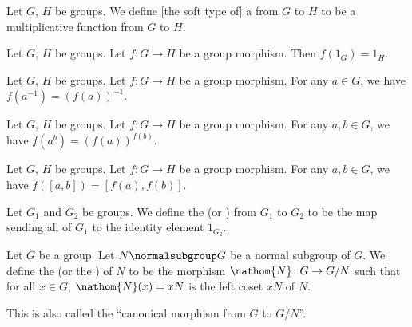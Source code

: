 \begin{definition}
Let $G$, $H$ be groups.
We define [the soft type of] a  from $G$ to $H$
to be a multiplicative function from $G$ to $H$.
\end{definition}

\begin{theorem}
Let $G$, $H$ be groups.
Let $f\colon G\to H$ be a group morphism.
Then $f(1_{G})=1_{H}$.
\end{theorem}

\begin{theorem}
Let $G$, $H$ be groups.
Let $f\colon G\to H$ be a group morphism.
For any $a\in G$, we have $f(a^{-1})=(f(a))^{-1}$.
\end{theorem}

\begin{theorem}
Let $G$, $H$ be groups.
Let $f\colon G\to H$ be a group morphism.
For any $a,b\in G$, we have $f(a^{b})=(f(a))^{f(b)}$.
\end{theorem}

\begin{theorem}
Let $G$, $H$ be groups.
Let $f\colon G\to H$ be a group morphism.
For any $a,b\in G$, we have $f([a,b])=[f(a),f(b)]$.
\end{theorem}

\begin{definition}
Let $G_{1}$ and $G_{2}$ be groups.
We define the  (or )
from $G_{1}$ to $G_{2}$ to be the map sending all of $G_{1}$ to the
identity element $1_{G_{2}}$.
\end{definition}

\begin{definition}
Let $G$ be a group.
Let $N\normalsubgroup G$ be a normal subgroup of $G$.
We define the  (or the ) of $N$ to be the morphism
$\nathom{N}\colon G\to G/N$ such that for all $x\in G$, $\nathom{N}(x)=xN$ is
the left coset $xN$ of $N$.

This is also called the ``canonical morphism from $G$ to $G/N$''.
\end{definition}

